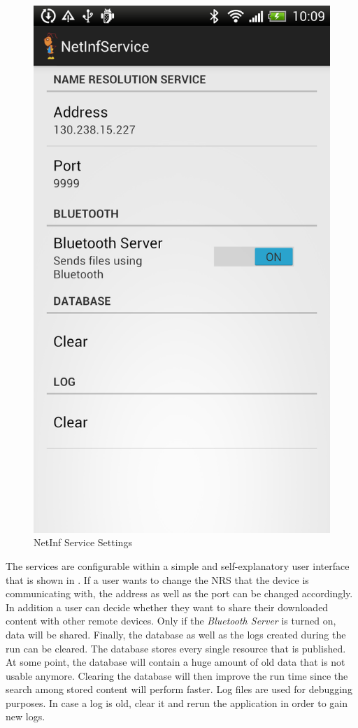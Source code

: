 \begin{figure}
\centering
\includegraphics[scale=0.29]{img/ant_settings.png}
\caption{NetInf Service Settings}\label{fig:servicesettings}
\end{figure}

The services are configurable within a simple and self-explanatory user interface that is shown in .
If a user wants to change the NRS that the device is communicating with, the address as well as the port can be changed accordingly.
In addition a user can decide whether they want to share their downloaded content with other remote devices. Only if the \textit{Bluetooth Server} 
is turned on, data will be shared.
Finally, the database as well as the logs created during the run can be cleared.
The database stores every single resource that is published. At some point, the database will contain a huge amount of old data that is not
usable anymore. Clearing the database will then improve the run time since the search among stored content will perform faster.
Log files are used for debugging purposes. In case a log is old, clear it and rerun the application in order to 
gain new logs.
